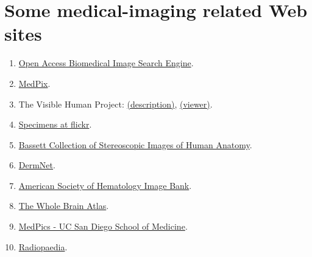 \section{Some medical-imaging related Web sites}
\begin{enumerate}
\item \href{https://openi.nlm.nih.gov/}{Open Access Biomedical Image Search Engine}.
\item \href{https://medpix.nlm.nih.gov/home}{MedPix}.
\item The Visible Human Project:
  \href{https://www.nlm.nih.gov/research/visible/visible_human.html}{(description)},
  \href{https://visiblehumanproject.com/}{(viewer)}.
\item
  \href{https://www.flickr.com/photos/euthman/albums/72057594114099781/}{Specimens
    at flickr}.
\item
  \href{https://lane.stanford.edu/biomed-resources/bassett/index.html}{Bassett
    Collection of Stereoscopic Images of Human Anatomy}.
\item \href{https://dermnetnz.org/images}{DermNet}.
\item \href{http://imagebank.hematology.org/}{American Society of
    Hematology Image Bank}.
\item \href{http://www.med.harvard.edu/AANLIB/home.html}{The Whole
    Brain Atlas}.
\item \href{https://medpics.ucsd.edu/index.cfm}{MedPics - UC San Diego
    School of Medicine}.
\item \href{https://radiopaedia.org/}{Radiopaedia}.
\end{enumerate}
